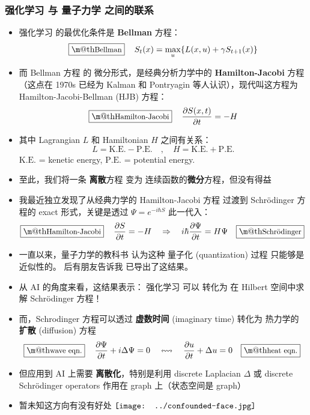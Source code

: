 \documentclass[15pt]{beamer}
\makeatletter
\newcommand{\red}[1]{{\color{red}#1}}
\newcommand*\confoundFace{$\vcenter{\hbox{\texttt{[image: ../confounded-face.jpg]}}}$}
\renewcommand{\boxed}[1]{\fbox{\m@th$\displaystyle\scalebox{0.9}{#1}$} \,}
\makeatother
\begin{document}
\begin{frame}
\frametitle{强化学习 与 量子力学 之间的联系}
\begin{itemize}
	\item 强化学习 的最优化条件是 \textbf{Bellman} 方程：
		\begin{equation}
			\boxed{\mbox{Bellman}} \quad S_t(x) = \max_u \{ L(x,u) + \gamma S_{t+1}(x) \}
		\end{equation}
	\item 而 Bellman 方程 的 微分形式，是经典分析力学中的 \textbf{Hamilton-Jacobi} 方程 （这点在 1970s 已经为 Kalman 和 Pontryagin 等人认识），现代叫这方程为 Hamilton-Jacobi-Bellman (HJB) 方程：
		\begin{equation}
			\boxed{\mbox{Hamilton-Jacobi}} \quad \frac{\partial S(x, t)}{\partial t} = -H
		\end{equation}
	\item 其中 Lagrangian $L$ 和 Hamiltonian $H$ 之间有关系：
	\begin{equation}
		L = \text{K.E.} - \text{P.E.} \quad , \quad H = \text{K.E.} + \text{P.E.}
	\end{equation}
		$\text{K.E.}$ = kenetic energy, $\text{P.E.}$ = potential energy.
	\item 至此，我们将一条 \textbf{离散}方程 变为 连续函数的\textbf{微分}方程，但\red{没有得益}
\end{itemize}
\end{frame}

\begin{frame}[plain]
\begin{itemize}
	\item 我最近独立发现了从经典力学的 Hamilton-Jacobi 方程 过渡到 Schr\"{o}dinger 方程的 exact 形式，关键是透过 $\Psi = e^{-i \hbar S}$ 此一代入：
		\begin{equation}
		\boxed{\mbox{Hamilton-Jacobi}} \quad \frac{\partial S}{\partial t} = - H \quad
		\Rightarrow
		\quad i \hbar \frac{\partial \Psi}{\partial t} = H \Psi \quad \boxed{\mbox{Schr\"{o}dinger}}
		\end{equation} 
	\item 一直以来，量子力学的教科书 认为这种 量子化 (quantization) 过程 只能够是近似性的。  后有朋友告诉我 \parencite{Field2010} 已导出了这结果。
	\item 从 AI 的角度来看，这结果表示： \red{强化学习 可以 转化为 在 Hilbert 空间中求解 Schr\"{o}dinger 方程！}
	\item 而，Schrodinger 方程可以透过 \textbf{虚数时间} (imaginary time) 转化为 热力学的 \textbf{扩散} (diffusion) 方程
		\begin{equation}
			\boxed{\mbox{wave eqn.}} \quad \frac{\partial \Psi}{\partial t} + i \Delta \Psi = 0
			\quad \leftrightsquigarrow \quad
			\frac{\partial u}{\partial t} + \Delta u = 0 \quad \boxed{\mbox{heat eqn.}}
		\end{equation}
	\item 但应用到 AI 上需要 \textbf{离散化}，特别是利用 discrete Laplacian $\Delta$ 或 discrete Schr\"{o}dinger operators 作用在 \red{graph} 上（状态空间是 graph）
	\item 暂未知这方向有没有好处 \confoundFace
\end{itemize}
\end{frame}
\end{document}
